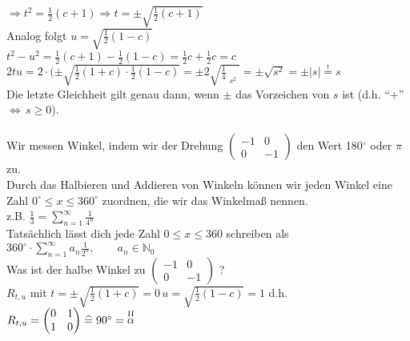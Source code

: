 $\Rightarrow t^{2} = \frac{1}{2}(c+1) \Rightarrow t = \pm \sqrt{\frac{1}{2}(c+1)}$\\
Analog folgt $u=\sqrt{\frac{1}{2}(1-c)}$ \\
$t^{2}-u^{2} = \frac{1}{2}(c+1)-\frac{1}{2}(1-c)=\frac{1}{2}c + \frac{1}{2}c = c$\\
$2tu=2\cdot(\pm\sqrt{\frac{1}{2}(1+c)\cdot\frac{1}{2}(1-c)} = \pm 2 \sqrt{\frac{1}{4}\mathop{\underbrace{(1-c^{2})}}\limits_{s^{2}}} = \pm \sqrt{s^{2}} = \pm \vert s \vert \mathop{=}\limits^{\text{!}} s$\\
Die letzte Gleichheit gilt genau dann, wenn $\pm$ das Vorzeichen von $s$ ist (d.h. "`+"' $\Leftrightarrow \, s \geq 0$).\\
\qquad\\
Wir messen Winkel, indem wir der Drehung $\begin{pmatrix} -1 & 0 \\ 0 & -1 \end{pmatrix}$ den Wert 180$^{\circ}$ oder $\pi$ zu.\\
Durch das Halbieren und Addieren von Winkeln können wir jeden Winkel eine Zahl $0^{\circ} \leq x \leq 360^{\circ}$ zuordnen, die wir das Winkelmaß nennen. \\
z.B. $\frac{1}{3} = \sum\limits^{\infty}_{n=1} \frac{1}{4^{n}}$\\
Tatsächlich lässt dich jede Zahl $ 0 \leq x \leq 360 $ schreiben als $360^{\circ} \cdot  \sum\limits^{\infty}_{n=1}a_{n}\frac{1}{2^{n}}, \qquad a_{n}\in  \mathbb{N}_{0}$ \\
Was ist der halbe Winkel zu $\begin{pmatrix} -1 & 0 \\ 0 & -1 \end{pmatrix}$ ?\\
$R_{t,u}$ mit $t = \pm \sqrt{\frac{1}{2}(1+c)} = 0 \, u = \sqrt{\frac{1}{2}(1-c)} = 1$ d.h. $R_{t,u} = \begin{pmatrix} 0 & 1 \\ 1 & 0 \end{pmatrix} \mathrel{\widehat{=}} 90^{\circ} = \mathop{\alpha}\limits^{\text{\RM{2}}}$